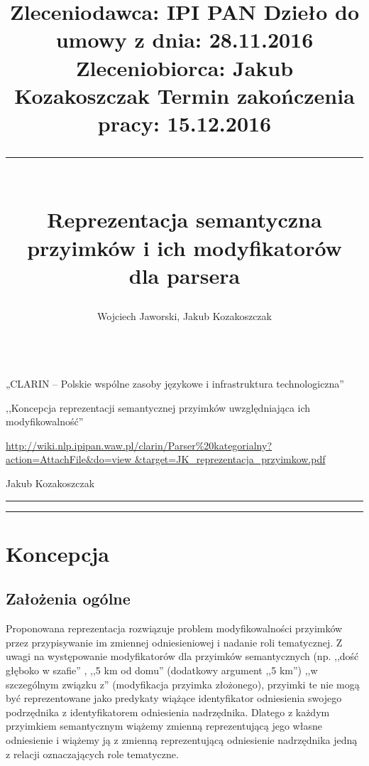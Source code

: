 \documentclass[a4paper, 12pt]{article}
\title{
\normalsize
\setlength{\topsep}{0pt} 
\noindent
Zleceniodawca: IPI PAN \hfill Dzieło do umowy z dnia: 28.11.2016 \\
Zleceniobiorca: Jakub Kozakoszczak \hfill Termin zakończenia pracy: 15.12.2016 \\
\rule{\linewidth}{2pt} \\[6pt] 
\huge Reprezentacja semantyczna \\ przyimków i ich modyfikatorów \\ dla parsera \eniam \\[-2pt]}
\author{\Large Wojciech Jaworski, Jakub Kozakoszczak\\[6pt]
\hspace{-5pt}\rule{\linewidth}{2pt} }
\date{}
\theoremstyle{remark}
\begin{document}

\maketitle

\vspace{-26pt}
\begin{description}
	\setlength{\itemsep}{4pt} 
	\setlength{\parskip}{0pt} 
	\item[Zrealizowane w ramach projektu:] „CLARIN -- Polskie wspólne zasoby językowe i infrastruktura technologiczna”
	\item[Tytuł pracy zamówionej:] ,,Koncepcja reprezentacji semantycznej przyimków uwzględniająca ich modyfikowalność''
	\item[Adres dzieła:] \url{http://wiki.nlp.ipipan.waw.pl/clarin/Parser%
	&target=JK_reprezentacja_przyimkow.pdf}
	\item[Opracowanie dokumentu:] Jakub Kozakoszczak
\end{description}

\vspace{6pt}
\hrule
\vspace{-14pt}
\renewcommand\contentsname{\normalsize{}}
\tableofcontents
\vspace{20pt}
\hrule
\newpage

\section{Koncepcja} %

\subsection{Założenia ogólne} %
\label{sub:zalożenia_oglne}


Proponowana reprezentacja rozwiązuje problem modyfikowalności przyimków przez przypisywanie im zmiennej odniesieniowej i nadanie roli tematycznej.
Z uwagi na występowanie modyfikatorów dla przyimków semantycznych (np. ,,dość głęboko w szafie'' , ,,5 km od domu'' (dodatkowy argument ,,5 km'') ,,w szczególnym związku z'' (modyfikacja przyimka złożonego), przyimki te nie mogą być reprezentowane jako predykaty wiążące identyfikator odniesienia swojego podrzędnika z identyfikatorem odniesienia nadrzędnika.
Dlatego z każdym przyimkiem semantycznym wiążemy zmienną reprezentującą jego własne odniesienie i wiążemy ją z zmienną reprezentującą odniesienie nadrzędnika jedną z relacji oznaczających role tematyczne.
\end{document}
